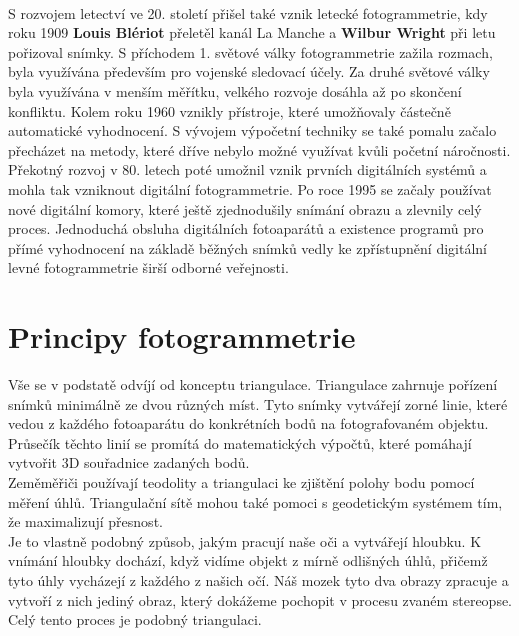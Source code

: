 \documentclass[12pt]{report}			%
\begin{document}
                \\S rozvojem letectví ve 20. století přišel také vznik letecké fotogrammetrie, kdy roku 1909 \textbf{Louis Blériot} přeletěl kanál La Manche a \textbf{Wilbur Wright} při letu pořizoval snímky. S příchodem 1. světové války fotogrammetrie zažila rozmach, byla využívána především pro vojenské sledovací účely. Za druhé světové války byla využívána v menším měřítku, velkého rozvoje dosáhla až po skončení konfliktu. Kolem roku 1960 vznikly přístroje, které umožňovaly částečně automatické vyhodnocení. S vývojem výpočetní techniky se také pomalu začalo přecházet na metody, které dříve nebylo možné využívat kvůli početní náročnosti. Překotný rozvoj v 80. letech poté umožnil vznik prvních digitálních systémů a mohla tak vzniknout digitální fotogrammetrie. Po roce 1995 se začaly používat nové digitální komory, které ještě zjednodušily snímání obrazu a zlevnily celý proces. Jednoduchá obsluha digitálních fotoaparátů a existence programů pro přímé vyhodnocení na základě běžných snímků vedly ke zpřístupnění digitální levné fotogrammetrie širší odborné veřejnosti. 



            \section{Principy fotogrammetrie}
                Vše se v podstatě odvíjí od konceptu triangulace. Triangulace zahrnuje pořízení snímků minimálně ze dvou různých míst. Tyto snímky vytvářejí zorné linie, které vedou z každého fotoaparátu do konkrétních bodů na fotografovaném objektu. Průsečík těchto linií se promítá do matematických výpočtů, které pomáhají vytvořit 3D souřadnice zadaných bodů.
                \\Zeměměřiči používají teodolity a triangulaci ke zjištění polohy bodu pomocí měření úhlů. Triangulační sítě mohou také pomoci s geodetickým systémem tím, že maximalizují přesnost.
                \\Je to vlastně podobný způsob, jakým pracují naše oči a vytvářejí hloubku. K vnímání hloubky dochází, když vidíme objekt z mírně odlišných úhlů, přičemž tyto úhly vycházejí z každého z našich očí. Náš mozek tyto dva obrazy zpracuje a vytvoří z nich jediný obraz, který dokážeme pochopit v procesu zvaném stereopse. Celý tento proces je podobný triangulaci.
                
\end{document}
